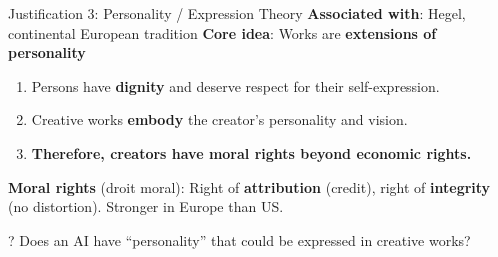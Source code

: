 \documentclass[aspectratio=169]{beamer}
\begin{document}
\begin{frame}{Justification 3: Personality / Expression Theory}
\textbf{Associated with}: Hegel, continental European tradition \hfill \textbf{Core idea}: Works are \textbf{extensions of personality}

\vspace{0.1cm}
\begin{argumentbox}
\begin{enumerate}
    \item Persons have \textbf{dignity} and deserve respect for their self-expression.
    \item Creative works \textbf{embody} the creator's personality and vision.
    \item[\textbf{C.}] \textbf{Therefore, creators have moral rights beyond economic rights.}
\end{enumerate}
\end{argumentbox}

\vspace{0.1cm}
\textbf{Moral rights} (droit moral): Right of \textbf{attribution} (credit), right of \textbf{integrity} (no distortion). Stronger in Europe than US.

\begin{alertblock}{?}
Does an AI have ``personality'' that could be expressed in creative works?
\end{alertblock}
\end{frame}
\end{document}
